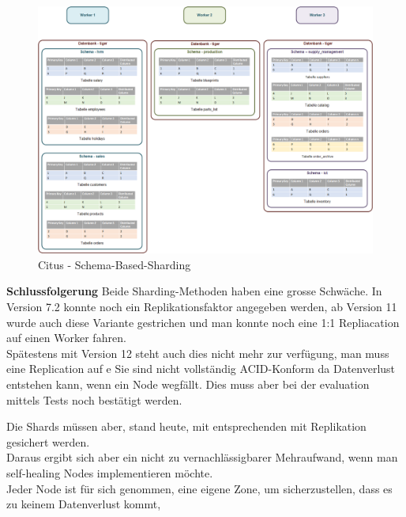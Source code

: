 \begin{flushleft}
\begin{flushleft}
\begin{flushleft}
\begin{figure}[H]
                \includegraphics[width=0.8\linewidth]{source/implementation/evaluation/postgresql_ha_solutions/stackgres/citus_schema-based-sharding}
                \caption{Citus - Schema-Based-Sharding}
                \label{fig:citus_schema-based-sharding}
            \end{figure}
        \end{flushleft}
        \begin{flushleft}
            \textbf{Schlussfolgerung}
            Beide Sharding-Methoden haben eine grosse Schwäche.
            In Version 7.2 konnte noch ein Replikationsfaktor angegeben werden\cite{8W58EW47}, ab Version 11 wurde auch diese Variante gestrichen und man konnte noch eine 1:1 Repliacation auf einen Worker fahren\cite{JWYDYYWQ}.\\
            Spätestens mit Version 12 steht auch dies nicht mehr zur verfügung, man muss eine Replication auf e
            Sie sind nicht vollständig ACID-Konform da Datenverlust entstehen kann, wenn ein Node wegfällt.
            Dies muss aber bei der evaluation mittels Tests noch bestätigt werden.
        \end{flushleft}
        \begin{flushleft}
            Die Shards müssen aber, stand heute, mit entsprechenden mit Replikation gesichert werden\cite{4GDXA49I}.\\
            Daraus ergibt sich aber ein nicht zu vernachlässigbarer Mehraufwand, wenn man self-healing Nodes implementieren möchte.\\
            Jeder Node ist für sich genommen, eine eigene Zone, um sicherzustellen, dass es zu keinem Datenverlust kommt,\\

\end{flushleft}
\end{flushleft}
\end{flushleft}
